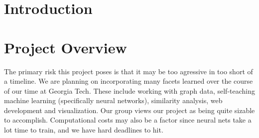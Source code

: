 \documentclass[sigchi, 12pt, nonacm=true, timestamp=true, screen=true]{acmart}
\begin{document}



\maketitle

\section{Introduction}


\section{Project Overview}











The primary risk this project poses is that it may be too agressive in too short of a timeline. We are planning on incorporating many facets learned over the course of our time at Georgia Tech. These include working with graph data, self-teaching machine learning (specifically neural networks), similarity analysis, web development and visualization. Our group views our project as being quite sizable to accomplish. Computational costs may also be a factor since neural nets take a lot time to train, and we have hard deadlines to hit.
\end{document}

